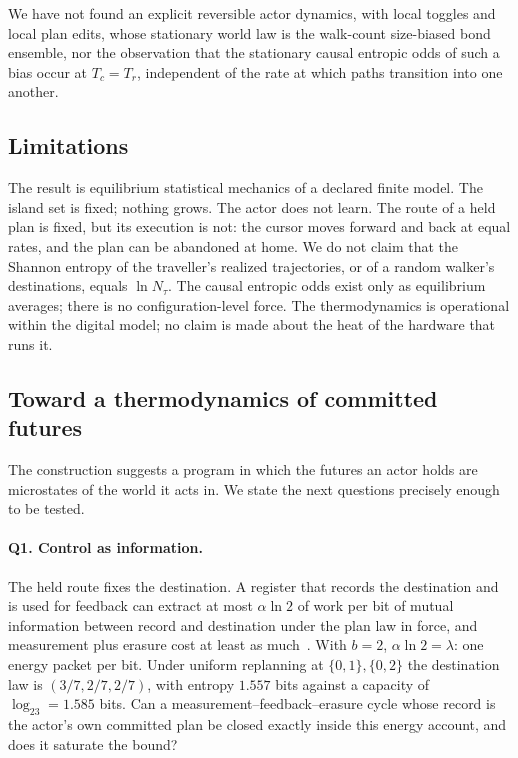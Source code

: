 \documentclass[aps,pre,preprint,superscriptaddress,nofootinbib]{revtex4-2}
\theoremstyle{definition}
\theoremstyle{remark}
\newcommand{\N}{N_\tau}
\begin{document}
We have not found an explicit reversible actor dynamics, with local toggles and local plan edits, whose stationary world law is the walk-count size-biased bond ensemble, nor the observation that the stationary causal entropic odds of such a bias occur at $T_c=T_r$, independent of the rate at which paths transition into one another.

\subsection{Limitations}

The result is equilibrium statistical mechanics of a declared finite model. The island set is fixed; nothing grows. The actor does not learn. The route of a held plan is fixed, but its execution is not: the cursor moves forward and back at equal rates, and the plan can be abandoned at home. We do not claim that the Shannon entropy of the traveller's realized trajectories, or of a random walker's destinations, equals $\ln\N$. The causal entropic odds exist only as equilibrium averages; there is no configuration-level force. The thermodynamics is operational within the digital model; no claim is made about the heat of the hardware that runs it.

\subsection{Toward a thermodynamics of committed futures}
\label{sec:frontier}

The construction suggests a program in which the futures an actor holds are microstates of the world it acts in. We state the next questions precisely enough to be tested.

\paragraph*{Q1. Control as information.} The held route fixes the destination. A register that records the destination and is used for feedback can extract at most $\alpha\ln2$ of work per bit of mutual information between record and destination under the plan law in force, and measurement plus erasure cost at least as much~\cite{Szilard1929,Landauer1961,TouchetteLloyd2000,SagawaUeda2009,SagawaUeda2012,Parrondo2015}. With $b=2$, $\alpha\ln2=\lambda$: one energy packet per bit. Under uniform replanning at $\{0,1\},\{0,2\}$ the destination law is $(3/7,2/7,2/7)$, with entropy $1.557$ bits against a capacity of $\log_23=1.585$ bits. Can a measurement--feedback--erasure cycle whose record is the actor's own committed plan be closed exactly inside this energy account, and does it saturate the bound?
\end{document}
